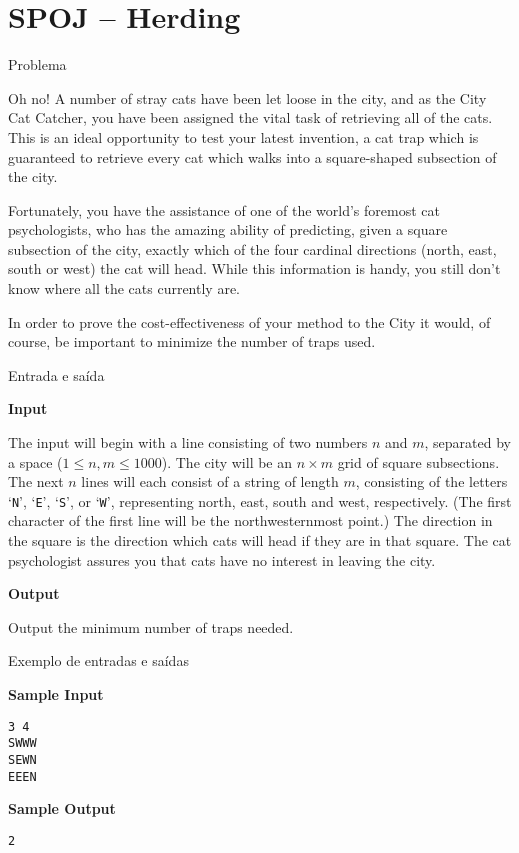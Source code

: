 \section{SPOJ -- Herding}

\begin{frame}[fragile]{Problema}

Oh no! A number of stray cats have been let loose in the city, and as the City Cat Catcher, you have been assigned the vital task of retrieving all of the cats. This is an ideal opportunity to test your latest invention, a cat trap which is guaranteed to retrieve every cat which walks into a square-shaped subsection of the city.

Fortunately, you have the assistance of one of the world's foremost cat psychologists, who has the amazing ability of predicting, given a square subsection of the city, exactly which of the four cardinal directions (north, east, south or west) the cat will head. While this information is handy, you still don't know where all the cats currently are.

In order to prove the cost-effectiveness of your method to the City it would, of course, be important to minimize the number of traps used.

\end{frame}

\begin{frame}[fragile]{Entrada e saída}

\textbf{Input}

The input will begin with a line consisting of two numbers $n$ and $m$, separated by a space 
($1 \leq n, m \leq 1000$). The city will be an $n \times m$ grid of square subsections. The next 
$n$ lines will each consist of a string of length $m$, consisting of the letters `\texttt{N}', 
`\texttt{E}', `\texttt{S}', or `\texttt{W}', representing north, east, south and west, 
respectively. (The first character of the first line will be the northwesternmost point.) The 
direction in the square is the direction which cats will head if they are in that square. The cat 
psychologist assures you that cats have no interest in leaving the city.

\textbf{Output}

Output the minimum number of traps needed.

\end{frame}

\begin{frame}[fragile]{Exemplo de entradas e saídas}

\begin{minipage}[t]{0.5\textwidth}
\textbf{Sample Input}
\begin{verbatim}
3 4
SWWW
SEWN
EEEN
\end{verbatim}
\end{minipage}
\begin{minipage}[t]{0.45\textwidth}
\textbf{Sample Output}
\begin{verbatim}
2
\end{verbatim}
\end{minipage}
\end{frame}

